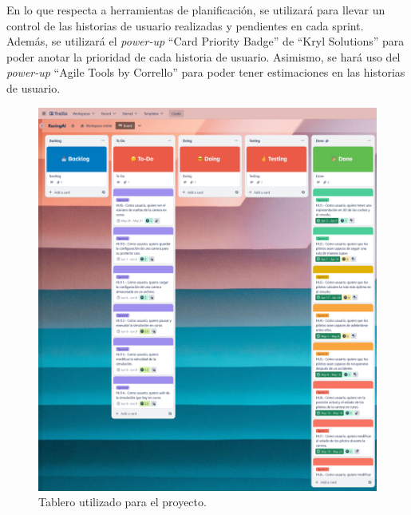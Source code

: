 En lo que respecta a herramientas de planificación, se utilizará \planApp para llevar un control de las historias de usuario realizadas y pendientes en cada sprint. Además, se utilizará el \textit{power-up} ``Card Priority Badge'' de ``Kryl Solutions'' para poder anotar la prioridad de cada historia de usuario. Asimismo, se hará uso del \textit{power-up} ``Agile Tools by Corrello'' para poder tener estimaciones en las historias de usuario.

\begin{figure}[H]
    \centering
    \includegraphics[width=\textwidth]{imagenes/trello-mio.png}
    \caption{Tablero utilizado para el proyecto.}
\end{figure}



